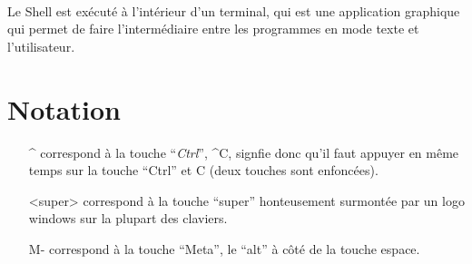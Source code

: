 \paragraph{} Le Shell est exécuté à l'intérieur d'un terminal, qui est une
application graphique qui permet de faire l'intermédiaire entre les programmes
en mode texte et l'utilisateur.

\part{Notation}

\begin{enumerate}
	\item[\^{}] correspond à la touche ``\emph{Ctrl}'', \^{}C, signfie donc
		qu'il faut appuyer en même temps sur la touche ``Ctrl'' et C (deux
		touches sont enfoncées).
	\item [<super>] correspond à la touche ``super'' honteusement surmontée par
		un logo windows sur la plupart des claviers.
	\item [M-] correspond à la touche ``Meta'', le ``alt'' à côté de la touche
		espace.
\end{enumerate}

\newpage
